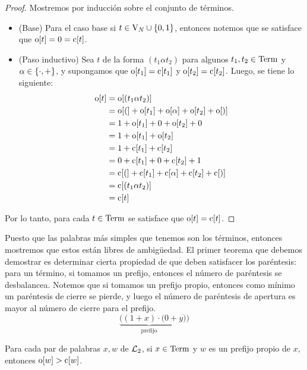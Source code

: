 \begin{proof}
	Mostremos por inducción sobre el conjunto de términos.
	\begin{itemize}
		\item (Base) Para el caso base si $t\in\VARIABLES[N]\cup\set*{0, 1}$, entonces notemos que se satisface que $\ABIERTO\bra*{t} = 0 =\CERRADO\bra*{t}$.
		\item (Paso inductivo) Sea $t$ de la forma $(t_{1}\alpha t_{2})$ para algunos $t_{1}, t_{2}\in\TERMINOS$ y $\alpha\in\set*{\cdot, +}$, y supongamos que $\ABIERTO\bra*{t_{1}} = \CERRADO\bra*{t_{1}}$ y $\ABIERTO\bra*{t_{2}} =\CERRADO\bra*{t_{2}}$. Luego, se tiene lo siguiente:
		\begin{align*}
			\ABIERTO\bra*{t} &=\ABIERTO\bra*{\pa*{t_{1}\alpha t_{2}}}\\
			&=\ABIERTO\bra*{(} + \ABIERTO\bra*{t_{1}} +\ABIERTO\bra*{\alpha} +\ABIERTO\bra*{t_{2}} +\ABIERTO\bra*{)}\\
			&= 1 +\ABIERTO\bra*{t_{1}} + 0 +\ABIERTO\bra*{t_{2}} + 0\\
			&= 1 +\ABIERTO\bra*{t_{1}} +\ABIERTO\bra*{t_{2}}\\
			&= 1 +\CERRADO\bra*{t_{1}} +\CERRADO\bra*{t_{2}}\\
			&= 0 +\CERRADO\bra*{t_{1}} + 0 +\CERRADO\bra*{t_{2}} + 1\\
			&=\CERRADO\bra*{(} +\CERRADO\bra*{t_{1}} +\CERRADO\bra*{\alpha} +\CERRADO\bra*{t_{2}} +\CERRADO\bra*{)}\\
			&=\CERRADO\bra*{\pa*{t_{1}\alpha t_{2}}}\\
			&=\CERRADO\bra*{t}
		\end{align*}
	\end{itemize}

	Por lo tanto, para cada $t\in\TERMINOS$ se satisface que $\ABIERTO\bra*{t} =\CERRADO\bra*{t}$.
\end{proof}

Puesto que las palabras más simples que tenemos son los términos, entonces mostremos que estos están libres de ambigüedad. El primer teorema que debemos demostrar es determinar cierta propiedad de que deben satisfacer los paréntesis: para un término, si tomamos un prefijo, entonces el número de paréntesis se desbalancea. Notemos que si tomamos un prefijo propio, entonces como mínimo un paréntesis de cierre se pierde, y luego el número de paréntesis de apertura es mayor al número de cierre para el prefijo.
\[
	\underbrace{((1 + x)\cdot(0 + }_{\text{prefijo}}y))
\]

\begin{theorem}
	\label{theo: prefijos_terminos} %
	Para cada par de palabras $x, w$ de $\ARITMETICA$, si $x\in\TERMINOS$ y $w$ es un prefijo propio de $x$, entonces $\ABIERTO\bra*{w} >\CERRADO\bra*{w}$.
\end{theorem}

